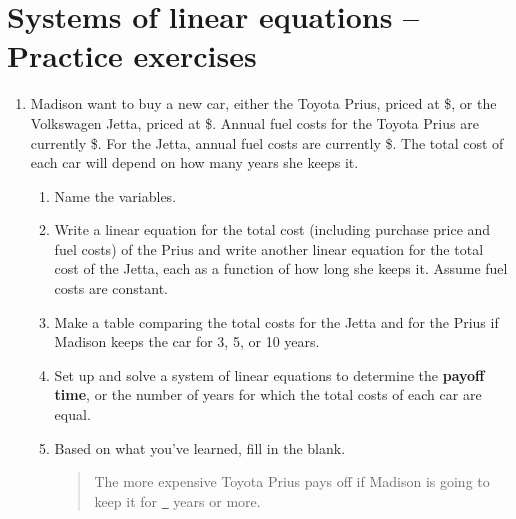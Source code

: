 \section{Systems of linear equations -- Practice exercises}

\begin{enumerate}
\item Madison want to buy a new car, either the Toyota Prius, priced at \$, or the Volkswagen Jetta, priced at \$.  Annual fuel costs for the Toyota Prius are currently \$.  For the Jetta, annual fuel costs are currently \$.  The total cost of each car will depend on how many years she keeps it. 
\begin{enumerate}
\item Name the variables. \vfill
\item Write a linear equation for the total cost (including purchase price and fuel costs) of the Prius and write another linear equation for the total cost of the Jetta, each as a function of how long she keeps it.  Assume fuel costs are constant. \vfill
\item Make a table comparing the total costs for the Jetta and for the Prius if Madison keeps the car for 3, 5, or 10 years. \vfill
\item Set up and solve a system of linear equations to determine the \textbf{payoff time}, or the number of years for which the total costs of each car are equal. \vfill \vfill
\item Based on what you've learned, fill in the blank.
\begin{quote}
The more expensive Toyota Prius pays off if Madison is going to keep it for \underline{\quad~} years or more.  
\end{quote}
\end{enumerate}

\newpage %


\end{enumerate}
